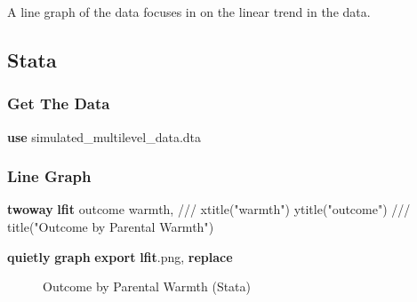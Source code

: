 \documentclass[
  letterpaper,
  DIV=11,
  numbers=noendperiod]{scrreprt}
\newenvironment{Shaded}{\begin{snugshade}}{\end{snugshade}}
\newcommand{\BaseNTok}[1]{\textcolor[rgb]{0.68,0.00,0.00}{#1}}
\newcommand{\CommentTok}[1]{\textcolor[rgb]{0.37,0.37,0.37}{#1}}
\newcommand{\KeywordTok}[1]{\textcolor[rgb]{0.00,0.23,0.31}{\textbf{#1}}}
\newcommand{\NormalTok}[1]{\textcolor[rgb]{0.00,0.23,0.31}{#1}}
\newcommand{\StringTok}[1]{\textcolor[rgb]{0.13,0.47,0.30}{#1}}
\begin{document}
A line graph of the data focuses in on the linear trend in the data.

\subsection{Stata}

\subsubsection{Get The Data}\label{get-the-data-3}

\begin{Shaded}
\begin{Highlighting}[]

\KeywordTok{use}\NormalTok{ simulated\_multilevel\_data.dta}
\end{Highlighting}
\end{Shaded}

\subsubsection{Line Graph}\label{line-graph}

\begin{Shaded}
\begin{Highlighting}[]
\KeywordTok{twoway} \KeywordTok{lfit}\NormalTok{ outcome warmth, }\CommentTok{///}
  \BaseNTok{xtitle}\NormalTok{(}\StringTok{"warmth"}\NormalTok{) }\BaseNTok{ytitle}\NormalTok{(}\StringTok{"outcome"}\NormalTok{) }\CommentTok{///}
  \BaseNTok{title}\NormalTok{(}\StringTok{"Outcome by Parental Warmth"}\NormalTok{) }

\KeywordTok{quietly} \KeywordTok{graph} \KeywordTok{export} \KeywordTok{lfit}\NormalTok{.png, }\KeywordTok{replace}
\end{Highlighting}
\end{Shaded}

\begin{figure}


\caption{\label{fig-Statalfit}Outcome by Parental Warmth (Stata)}

\end{figure}%
\end{document}
